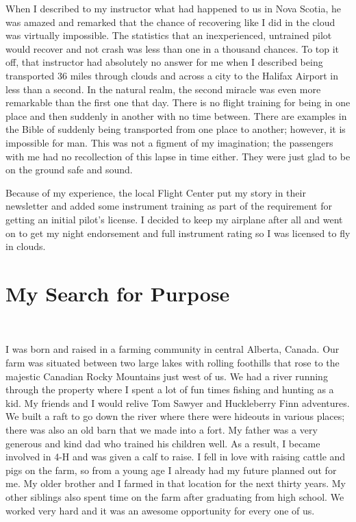 \documentclass[twoside, 12pt]{book}
\begin{document}
When I described to my instructor what had happened to us in Nova Scotia, he was amazed and remarked that the chance of recovering like I did in the cloud was virtually impossible. The statistics that an inexperienced, untrained pilot would recover and not crash was less than one in a thousand chances. To top it off, that instructor had absolutely no answer for me when I described being transported 36 miles through clouds and across a city to the Halifax Airport in less than a second. In the natural realm, the second miracle was even more remarkable than the first one that day. There is no flight training for being in one place and then suddenly in another with no time between. There are examples in the Bible of suddenly being transported from one place to another; however, it is impossible for man. This was not a figment of my imagination; the passengers with me had no recollection of this lapse in time either. They were just glad to be on the ground safe and sound.

Because of my experience, the local Flight Center put my story in their newsletter and added  some instrument training as part of the requirement for getting an initial pilot’s license. I decided to keep my airplane after all and went on to get my night endorsement and full instrument rating so I was licensed to fly in clouds.

\chapter{My Search for Purpose}
\

I was born and raised in a farming community in central Alberta, Canada. Our farm was situated between two large lakes with rolling foothills that rose to the majestic Canadian Rocky Mountains just west of us. We had a river running through the property where I spent a lot of fun times fishing and hunting as a kid. My friends and I would relive Tom Sawyer and Huckleberry Finn adventures. We built a raft to go down the river where there were hideouts in various places; there was also an old barn that we made into a fort. My father was a very generous and kind dad who trained his children well. As a result, I became involved in 4-H and was given a calf to raise. I fell in love with raising cattle and pigs on the farm, so from a young age I already had my future planned out for me. My older brother and I farmed in that location for the next thirty years. My other siblings also spent time on the farm after graduating from high school. We worked very hard and it was an awesome opportunity for every one of us.
\end{document}
